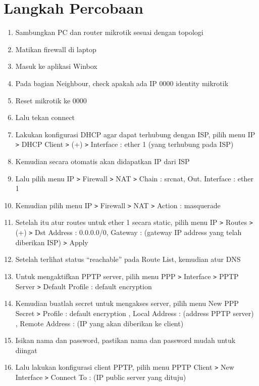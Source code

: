 \section{Langkah Percobaan}
\begin{enumerate}
    \item Sambungkan PC dan router mikrotik sesuai dengan topologi
    \item Matikan firewall di laptop
    \item Masuk ke aplikasi Winbox
    \item Pada bagian Neighbour, check apakah ada IP 0000 identity mikrotik
    \item Reset mikrotik ke 0000
    \item Lalu tekan connect
    \item Lakukan konfigurasi DHCP agar dapat terhubung dengan ISP, pilih menu IP \texttt{\text>} DHCP Client \texttt{\text>} (+) \texttt{\text>} Interface : ether 1 (yang terhubung pada ISP)
    \item Kemudian secara otomatis akan didapatkan IP dari ISP
    \item Lalu pilih menu IP \texttt{\text>} Firewall \texttt{\text>} NAT \texttt{\text>} Chain : srcnat, Out. Interface : ether 1
    \item Kemudian pilih menu IP \texttt{\text>} Firewall \texttt{\text>} NAT \texttt{\text>} Action : masquerade
    \item Setelah itu atur routes untuk ether 1 secara static, pilih menu IP \texttt{\text>} Routes \texttt{\text>} (+) \texttt{\text>} Dst Address : 0.0.0.0/0, Gateway : (gateway IP address yang telah diberikan ISP) \texttt{\text>} Apply
    \item Setelah terlihat status “reachable” pada Route List, kemudian atur DNS
    \item Untuk mengaktifkan PPTP server, pilih menu PPP \texttt{\text>} Interface \texttt{\text>} PPTP Server \texttt{\text>} Default Profile : default encryption
    \item Kemudian buatlah secret untuk mengakses server, pilih menu New PPP Secret \texttt{\text>} Profile : default encryption , Local Address : (address PPTP server) , Remote Address : (IP yang akan diberikan ke client)
    \item Isikan nama dan password, pastikan nama dan password mudah untuk diingat
    \item Lalu lakukan konfigurasi client PPTP, pilih menu PPTP Client \texttt{\text>} New Interface \texttt{\text>} Connect To : (IP public server yang dituju)

\end{enumerate}
